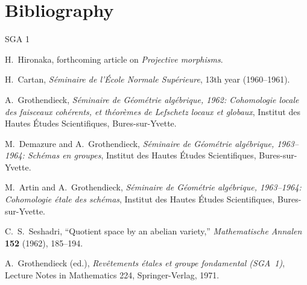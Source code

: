 \clearpage
{}
{}
\section*{Bibliography}

\begin{thebibliography}{SGA 1}

H.~Hironaka, forthcoming article on \emph{Projective morphisms}.

H.~Cartan, \emph{S\'eminaire de l'\'Ecole Normale Sup\'erieure},
13th year (1960--1961).

A.~Grothendieck, \emph{S\'eminaire de G\'eom\'etrie alg\'ebrique, 1962:
Cohomologie locale des faisceaux coh\'erents, et th\'eor\`emes de Lefschetz
locaux et globaux}, Institut des Hautes \'Etudes Scientifiques,
Bures-sur-Yvette.

M.~Demazure and A.~Grothendieck, \emph{S\'eminaire de G\'eom\'etrie
alg\'ebrique, 1963--1964: Sch\'emas en groupes}, Institut des Hautes
\'Etudes Scientifiques, Bures-sur-Yvette.

M.~Artin and A.~Grothendieck, \emph{S\'eminaire de G\'eom\'etrie
alg\'ebrique, 1963--1964: Cohomologie \'etale des sch\'emas}, Institut des
Hautes \'Etudes Scientifiques, Bures-sur-Yvette.

C.~S.~Seshadri, ``Quotient space by an abelian variety,''
\emph{Mathematische Annalen} \textbf{152} (1962), 185--194.

A.~Grothendieck (ed.), \emph{Rev\^etements \'etales et groupe fondamental
(SGA~1)}, Lecture Notes in Mathematics 224, Springer-Verlag, 1971.

\end{thebibliography}

